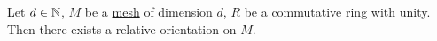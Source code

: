 \begin{theorem}
  Let
    $d \in \mathbb{N}$,
    $M$ be a \hyperref[cmc:mesh:definition]{mesh} of dimension $d$,
    $R$ be a commutative ring with unity.
  Then there exists a relative orientation on $M$.
\end{theorem}
